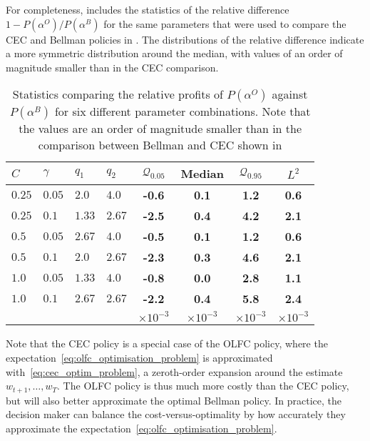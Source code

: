 \documentclass[main.tex]{subfiles}
\begin{document}
For completeness,  includes the statistics of the relative
difference $1-P(\alpha^O)/P(\alpha^B)$ for the same parameters
that were used to compare the CEC and Bellman policies in .
The distributions of the relative difference indicate a more symmetric
distribution around the median, with values of an order of magnitude
smaller than in the CEC comparison.
\begin{table}[htbp]
  \centering
  \begin{tabular}{llllcccc}
    \toprule
    $C$ & $\gamma$ & $q_1$ & $q_2$ & $\mathcal Q_{0.05}$
    &Median & $\mathcal Q_{0.95}$ &$L^2$\\
    \midrule
    $0.25$ & $0.05$ & $2.0$ & $4.0$
                                   & \textbf{-0.6} & \textbf{0.1} & \textbf{1.2} & \textbf{0.6} \\
    $0.25$ & $0.1$ & $1.33$ & $2.67$
                                   & \textbf{-2.5} & \textbf{0.4} & \textbf{4.2} & \textbf{2.1} \\
    $0.5$ & $0.05$ & $2.67$ & $4.0$
                                   & \textbf{-0.5} & \textbf{0.1} & \textbf{1.2} & \textbf{0.6} \\
    $0.5$ & $0.1$ & $2.0$ & $2.67$
                                   & \textbf{-2.3} & \textbf{0.3} & \textbf{4.6} & \textbf{2.1} \\
    $1.0$ & $0.05$ & $1.33$ & $4.0$
                                   & \textbf{-0.8} & \textbf{0.0} & \textbf{2.8} & \textbf{1.1} \\
    $1.0$ & $0.1$ & $2.67$ & $2.67$
                                   & \textbf{-2.2} & \textbf{0.4} & \textbf{5.8} & \textbf{2.4} \\
        &&&&$\times 10^{-3}$&$\times 10^{-3}$&$\times 10^{-3}$&$\times 10^{-3}$\\
    \bottomrule
  \end{tabular}
  \caption{Statistics comparing the relative profits of $P(\alpha^O)$
    against $P(\alpha^B)$ for six different
    parameter combinations. Note that the values are an order of magnitude
    smaller than in the comparison between Bellman and CEC shown in
    }\label{tbl:paramcomparisons_olfc}
\end{table}

Note that the CEC policy is a special case of the OLFC policy, where the
expectation~\eqref{eq:olfc_optimisation_problem} is approximated with~\eqref{eq:cec_optim_problem}, a zeroth-order expansion around
the estimate $w_{t+1},\dots,w_T$.
The OLFC policy is thus much more costly than the CEC policy, but will
also better approximate the optimal Bellman policy. In practice, the
decision maker can balance the cost-versus-optimality by how
accurately they
approximate the expectation~\eqref{eq:olfc_optimisation_problem}.
\end{document}
